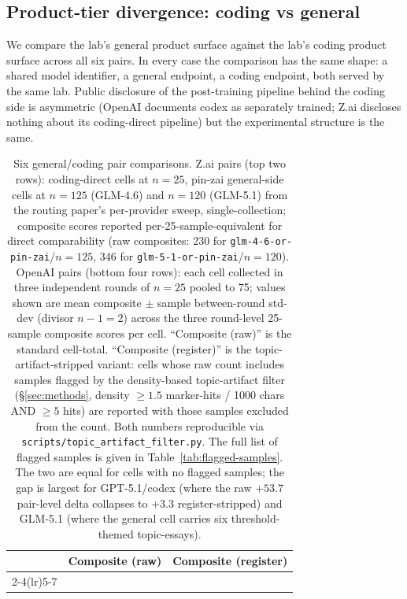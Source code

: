 \documentclass[11pt,a4paper]{article}
\begin{document}
\subsection{Product-tier divergence: coding vs general}
\label{sec:product-tier}

We compare the lab's general product surface against the lab's coding product surface across all six pairs. In every case the comparison has the same shape: a shared model identifier, a general endpoint, a coding endpoint, both served by the same lab. Public disclosure of the post-training pipeline behind the coding side is asymmetric (OpenAI documents codex as separately trained; Z.ai discloses nothing about its coding-direct pipeline) but the experimental structure is the same.

\begin{table}[h]
\centering
\caption{Six general/coding pair comparisons. Z.ai pairs (top two rows): coding-direct cells at $n{=}25$, pin-zai general-side cells at $n{=}125$ (GLM-4.6) and $n{=}120$ (GLM-5.1) from the routing paper's per-provider sweep, single-collection; composite scores reported per-25-sample-equivalent for direct comparability (raw composites: 230 for \texttt{glm-4-6-or-pin-zai}/$n{=}125$, 346 for \texttt{glm-5-1-or-pin-zai}/$n{=}120$). OpenAI pairs (bottom four rows): each cell collected in three independent rounds of $n{=}25$ pooled to 75; values shown are mean composite $\pm$ sample between-round std-dev (divisor $n{-}1{=}2$) across the three round-level 25-sample composite scores per cell. ``Composite (raw)'' is the standard cell-total. ``Composite (register)'' is the topic-artifact-stripped variant: cells whose raw count includes samples flagged by the density-based topic-artifact filter (\S\ref{sec:methods}, density $\ge 1.5$ marker-hits / 1000 chars AND $\ge 5$ hits) are reported with those samples excluded from the count. Both numbers reproducible via \texttt{scripts/topic\_artifact\_filter.py}. The full list of flagged samples is given in Table~\ref{tab:flagged-samples}. The two are equal for cells with no flagged samples; the gap is largest for GPT-5.1/codex (where the raw $+53.7$ pair-level delta collapses to $+3.3$ register-stripped) and GLM-5.1 (where the general cell carries six threshold-themed topic-essays).}
\label{tab:product-tier}
\small
\begin{tabular}{lrrrrrr}
\toprule
& \multicolumn{3}{c}{\textbf{Composite (raw)}} & \multicolumn{3}{c}{\textbf{Composite (register)}} \\
\cmidrule(lr){2-4}\cmidrule(lr){5-7}

\end{tabular}
\end{table}
\end{document}
